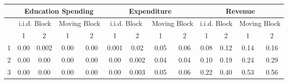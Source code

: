 %
\begin{tabular}{@{}lcccccccccccc@{}}
	\toprule
	& \multicolumn{4}{c}{ Education Spending } & \multicolumn{4}{c}{ Expenditure } & \multicolumn{4}{c}{ Revenue } \\ \hline
	& \multicolumn{2}{c}{ i.i.d. Block } & \multicolumn{2}{c}{ Moving Block } & \multicolumn{2}{c}{ i.i.d. Block } & \multicolumn{2}{c}{ Moving Block } & \multicolumn{2}{c}{ i.i.d. Block } & \multicolumn{2}{c}{ Moving Block }\\
	\hline
	\diagbox{$\tau$}{$q$} & 1 & 2 & 1 & 2 & 1 & 2 & 1 & 2 & 1 & 2 & 1 & 2 \\
	\hline
	1  & 0.00 & 0.002 & 0.00 & 0.00 & 0.001 & 0.02 & 0.05 & 0.06 & 0.08 & 0.12 & 0.14 & 0.16\\
	2 & 0.00 & 0.00 & 0.00 & 0.00 & 0.00 & 0.002 & 0.04 & 0.04 & 0.10 & 0.19 & 0.24 & 0.29 \\
	3 & 0.00 & 0.00 & 0.00 & 0.00 & 0.00 & 0.003 & 0.05 & 0.06 & 0.22 & 0.40 & 0.53 & 0.56 \\
	\bottomrule
\end{tabular}
